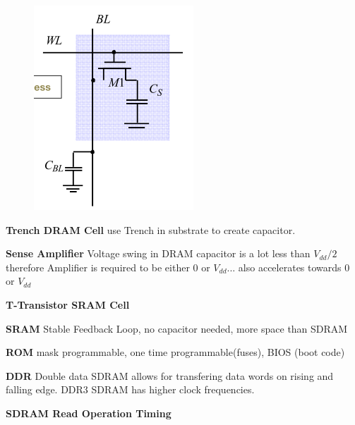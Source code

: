 \documentclass[english]{latex4ei/latex4ei_sheet}
\begin{document}
\begin{figure}
	\centering
	\includegraphics[width=1\linewidth]{images//5.Memory/DRAMCell.png}
\end{figure}

\textbf{Trench DRAM Cell} use Trench in substrate to create capacitor.

\textbf{Sense Amplifier} Voltage swing in DRAM capacitor is a lot less than $V_{dd} / 2$ therefore Amplifier is required to be either 0 or $V_{dd}$... also accelerates towards 0 or $V_{dd}$

\textbf{T-Transistor SRAM Cell}

\textbf{SRAM} Stable Feedback Loop, no capacitor needed, more space than SDRAM

\textbf{ROM} mask programmable, one time programmable(fuses), BIOS (boot code)

\textbf{DDR} Double data SDRAM allows for transfering data words on rising and falling edge. DDR3 SDRAM has higher clock frequencies.

\textbf{SDRAM Read Operation Timing}
\end{document}
